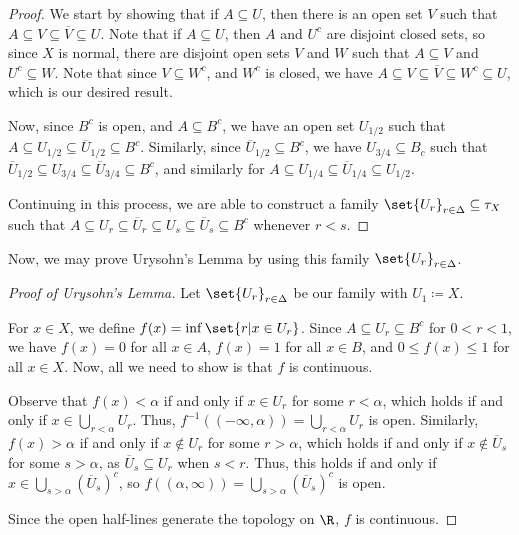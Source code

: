 \documentclass[10pt]{mypackage}
\begin{document}
\begin{proof}
  We start by showing that if $A\subseteq U$, then there is an open set $V$ such that $A\subseteq V \subseteq \overline{V} \subseteq U$. Note that if $A\subseteq U$, then $A$ and $U^{c}$ are disjoint closed sets, so since $X$ is normal, there are disjoint open sets $V$ and $W$ such that $A\subseteq V$ and $U^{c}\subseteq W$. Note that since $V\subseteq W^{c}$, and $W^{c}$ is closed, we have $A\subseteq V \subseteq \overline{V}\subseteq W^{c}\subseteq U$, which is our desired result.\newline

  Now, since $B^{c}$ is open, and $A\subseteq B^{c}$, we have an open set $U_{1/2}$ such that $A\subseteq U_{1/2} \subseteq \overline{U}_{1/2}\subseteq B^{c}$. Similarly, since $\overline{U}_{1/2}\subseteq B^{c}$, we have $U_{3/4}\subseteq B_{c}$ such that $\overline{U}_{1/2}\subseteq U_{3/4}\subseteq \overline{U}_{3/4}\subseteq B^{c}$, and similarly for $A\subseteq U_{1/4}\subseteq \overline{U}_{1/4}\subseteq U_{1/2}$.\newline

  Continuing in this process, we are able to construct a family $\set{U_{r}}_{r\in\Delta}\subseteq \tau_{X}$ such that $A\subseteq U_{r}\subseteq \overline{U}_{r}\subseteq U_{s}\subseteq \overline{U}_{s}\subseteq B^{c}$ whenever $r < s$.
\end{proof}
Now, we may prove Urysohn's Lemma by using this family $\set{U_r}_{r\in\Delta}$.
\begin{proof}[Proof of Urysohn's Lemma]
  Let $\set{U_r}_{r\in\Delta}$ be our family with $U_{1} \coloneq X$. \newline

  For $x\in X$, we define $f(x) = \inf\set{r | x\in U_r}$. Since $A\subseteq U_r\subseteq B^{c}$ for $0 < r < 1$, we have $f(x) = 0$ for all $x\in A$, $f(x) = 1$ for all $x\in B$, and $0 \leq f(x) \leq 1$ for all $x\in X$. Now, all we need to show is that $f$ is continuous.\newline

  Observe that $f(x) < \alpha$ if and only if $x\in U_r$ for some $r < \alpha$, which holds if and only if $x\in \bigcup_{r < \alpha}U_{r}$. Thus, $f^{-1}\left( \left( -\infty,\alpha \right) \right) = \bigcup_{r < \alpha}U_{r}$ is open. Similarly, $f(x) > \alpha$ if and only if $x\notin U_{r}$ for some $r > \alpha$, which holds if and only if $x\notin \overline{U}_{s}$ for some $s > \alpha$, as $\overline{U}_{s} \subseteq U_r$ when $s < r$. Thus, this holds if and only if $x\in \bigcup_{s > \alpha}\left( \overline{U}_s \right)^{c}$, so $f\left( \left( \alpha,\infty \right) \right) = \bigcup_{s > \alpha}\left( \overline{U}_s \right)^{c}$ is open.\newline

  Since the open half-lines generate the topology on $\R$, $f$ is continuous.
\end{proof}
\end{document}
